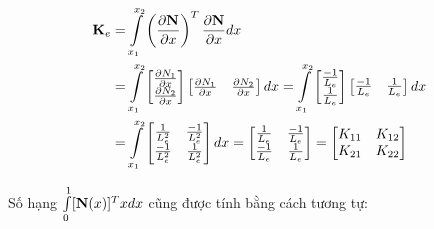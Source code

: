 \begin{equation}\label{eq_Ke}
    \begin{aligned}
        {\bf K}_e &= \int\limits_{x_1}^{x_2}\left(\frac{\partial{\bf N}}{\partial x}\right)^T\frac{\partial{\bf N}}{\partial x} dx \\
        & =\int\limits_{x_1}^{x_2}\begin{bmatrix}
            \frac{\partial N_1}{\partial x} \\ \frac{\partial N_2}{\partial x}
        \end{bmatrix}\begin{bmatrix}
            \frac{\partial N_1}{\partial x} &\frac{\partial N_2}{\partial x}
        \end{bmatrix}dx = \int\limits_{x_1}^{x_2}\begin{bmatrix}
            \frac{-1}{L_e} \\ \frac{1}{L_e}
        \end{bmatrix}\begin{bmatrix}
            \frac{-1}{L_e}& \frac{1}{L_e}
        \end{bmatrix}dx \\
        &= \int\limits_{x_1}^{x_2}\begin{bmatrix}
            \frac{1}{L_e^2} & \frac{-1}{L_e^2} \\
            \frac{-1}{L_e^2} & \frac{1}{L_e^2}
        \end{bmatrix}dx = \begin{bmatrix}
            \frac{1}{L_e} & \frac{-1}{L_e} \\
            \frac{-1}{L_e} & \frac{1}{L_e}
        \end{bmatrix} = \begin{bmatrix}
            K_{11} & K_{12} \\
            K_{21} & K_{22}
        \end{bmatrix}
    \end{aligned}
\end{equation}

Số hạng $ \int\limits_0^1 [{\bf N}(x)]^Tx dx$ cũng được tính bằng cách tương tự:

